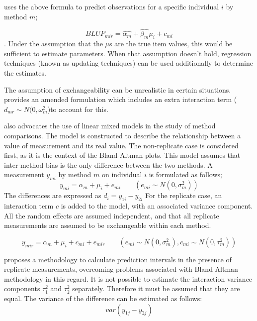 \documentclass[12pt, a4paper]{report}
\theoremstyle{plain}
\theoremstyle{definition}
\theoremstyle{remark}
\begin{document}


\citet{BXC2004} uses the above formula to predict observations for
a specific individual $i$ by method $m$;

\begin{equation}BLUP_{mir} = \hat{\alpha_{m}} + \hat{\beta_{m}}\mu_{i} +
c_{mi} \end{equation}. Under the assumption that the $\mu$s are
the true item values, this would be sufficient to estimate
parameters. When that assumption doesn't hold, regression
techniques (known as updating techniques) can be used additionally
to determine the estimates. 

The assumption of exchangeability can
be unrealistic in certain situations. \citet{BXC2004} provides an
amended formulation which includes an extra interaction term ($
d_{mr} \sim N(0,\omega^{2}_{m}$)to account for this.

\citet{BXC2004} also advocates the use of linear mixed models in
the study of method comparisons. The model is constructed to
describe the relationship between a value of measurement and its
real value. The non-replicate case is considered first, as it is
the context of the Bland-Altman plots. This model assumes that
inter-method bias is the only difference between the two methods.
A measurement $y_{mi}$ by method $m$ on individual $i$ is
formulated as follows;
\begin{equation}
y_{mi}  = \alpha_{m} + \mu_{i} + e_{mi} \qquad ( e_{mi} \sim
N(0,\sigma^{2}_{m}))
\end{equation}
The differences are expressed as $d_{i} = y_{1i} - y_{2i}$ For the
replicate case, an interaction term $c$ is added to the model,
with an associated variance component. All the random effects are
assumed independent, and that all replicate measurements are
assumed to be exchangeable within each method.

\begin{equation}
y_{mir}  = \alpha_{m} + \mu_{i} + c_{mi} + e_{mir} \qquad ( e_{mi}
\sim N(0,\sigma^{2}_{m}), c_{mi} \sim N(0,\tau^{2}_{m}))
\end{equation}

\citet{BXC2008} proposes a methodology to calculate prediction
intervals in the presence of replicate measurements, overcoming
problems associated with Bland-Altman methodology in this regard.
It is not possible to estimate the interaction variance components
$\tau^{2}_{1}$ and $\tau^{2}_{2}$ separately. Therefore it must be
assumed that they are equal. The variance of the difference can be
estimated as follows:
\begin{equation}
var(y_{1j}-y_{2j})
\end{equation}
\end{document}
